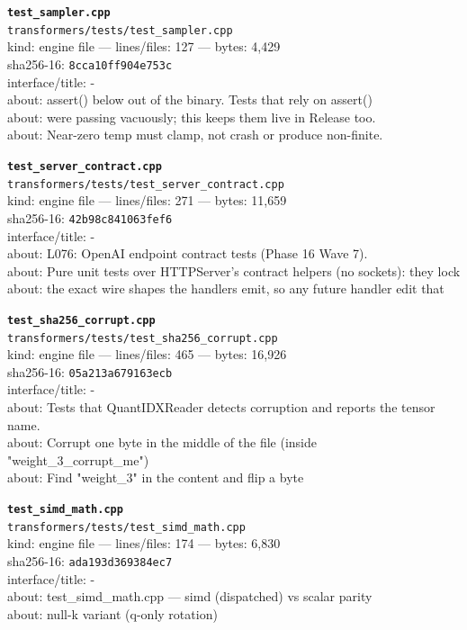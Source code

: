 \noindent\textbf{\texttt{test\_sampler.cpp}}\\
\texttt{transformers/tests/test\_sampler.cpp}\\
kind: engine file --- lines/files: 127 --- bytes: 4,429\\
sha256-16: \texttt{8cca10ff904e753c}\\
interface/title: -\\
about: assert() below out of the binary. Tests that rely on assert()\\
about: were passing vacuously; this keeps them live in Release too.\\
about: Near-zero temp must clamp, not crash or produce non-finite.\\
\vspace*{6.0pt}

\noindent\textbf{\texttt{test\_server\_contract.cpp}}\\
\texttt{transformers/tests/test\_server\_contract.cpp}\\
kind: engine file --- lines/files: 271 --- bytes: 11,659\\
sha256-16: \texttt{42b98c841063fef6}\\
interface/title: -\\
about: L076: OpenAI endpoint contract tests (Phase 16 Wave 7).\\
about: Pure unit tests over HTTPServer's contract helpers (no sockets): they lock\\
about: the exact wire shapes the handlers emit, so any future handler edit that\\
\vspace*{6.0pt}

\noindent\textbf{\texttt{test\_sha256\_corrupt.cpp}}\\
\texttt{transformers/tests/test\_sha256\_corrupt.cpp}\\
kind: engine file --- lines/files: 465 --- bytes: 16,926\\
sha256-16: \texttt{05a213a679163ecb}\\
interface/title: -\\
about: Tests that QuantIDXReader detects corruption and reports the tensor name.\\
about: Corrupt one byte in the middle of the file (inside "weight\_3\_corrupt\_me")\\
about: Find "weight\_3" in the content and flip a byte\\
\vspace*{6.0pt}

\noindent\textbf{\texttt{test\_simd\_math.cpp}}\\
\texttt{transformers/tests/test\_simd\_math.cpp}\\
kind: engine file --- lines/files: 174 --- bytes: 6,830\\
sha256-16: \texttt{ada193d369384ec7}\\
interface/title: -\\
about: test\_simd\_math.cpp — simd (dispatched) vs scalar parity\\
about: null-k variant (q-only rotation)\\
\vspace*{6.0pt}
\newpage


